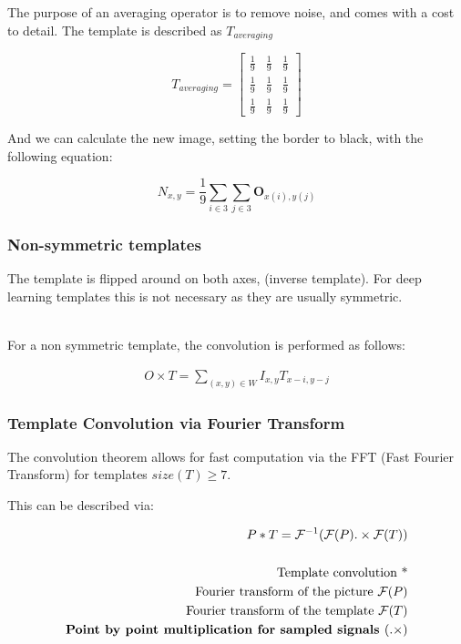 The purpose of an averaging operator is to remove noise, and comes with a cost to detail. The template is described as $T_{averaging}$

\begin{equation}
T_{averaging}=
    \begin{bmatrix}
    \frac{1}{9} & \frac{1}{9} & \frac{1}{9} \\
    \frac{1}{9} & \frac{1}{9} & \frac{1}{9} \\
    \frac{1}{9} & \frac{1}{9} & \frac{1}{9}
    \end{bmatrix}
\end{equation}

And we can calculate the new image, setting the border to black, with the following equation:

\begin{equation}
    N_{x,y} = \frac{1}{9} \sum_{i \in 3} \sum_{j \in 3} \mathbf{O}_{x(i),y(j)}
\end{equation}

\subsubsection{Non-symmetric templates}
The template is flipped around on both axes, (inverse template). For deep learning templates this is not necessary as they are usually symmetric.

\\ For a non symmetric template, the convolution is performed as follows:

\begin{align}
    O \times T = \sum_{(x,y)\in W} I_{x,y} T_{x-i,y-j}
\end{align}

\subsubsection{Template Convolution via Fourier Transform}

The convolution theorem allows for fast computation via the FFT (Fast Fourier Transform) for templates $size(T) \geq 7$.

This can be described via:

\begin{align}
    P * T = \mathcal{F}^{-1}(\mathcal{F}(P).\times\mathcal{F}(T)) \\ \\
    \text{Template convolution *} \\
    \text{Fourier transform of the picture }\mathcal{F}(P) \\
    \text{Fourier transform of the template }\mathcal{F}(T) \\
    \text{\textbf{Point by point multiplication for sampled signals }} (.\times)
\end{align}

